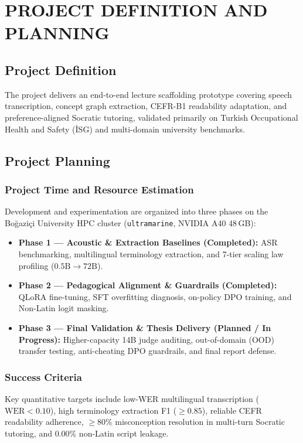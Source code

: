\documentclass[a4paper,12pt]{report}
\begin{document}
\chapter{PROJECT DEFINITION AND PLANNING}

\section{Project Definition}
The project delivers an end-to-end lecture scaffolding prototype covering speech transcription, concept graph extraction, CEFR-B1 readability adaptation, and preference-aligned Socratic tutoring, validated primarily on Turkish Occupational Health and Safety (\.{I}SG) and multi-domain university benchmarks.

\section{Project Planning}

\subsection{Project Time and Resource Estimation}
Development and experimentation are organized into three phases on the Bo\u{g}azi\c{c}i University HPC cluster (\texttt{ultramarine}, NVIDIA A40 48\,GB):
\begin{itemize}
    \item \textbf{Phase 1 --- Acoustic \& Extraction Baselines (Completed):} ASR benchmarking, multilingual terminology extraction, and 7-tier scaling law profiling ($0.5\text{B} \to 72\text{B}$).
    \item \textbf{Phase 2 --- Pedagogical Alignment \& Guardrails (Completed):} QLoRA fine-tuning, SFT overfitting diagnosis, on-policy DPO training, and Non-Latin logit masking.
    \item \textbf{Phase 3 --- Final Validation \& Thesis Delivery (Planned / In Progress):} Higher-capacity 14B judge auditing, out-of-domain (OOD) transfer testing, anti-cheating DPO guardrails, and final report defense.
\end{itemize}

\subsection{Success Criteria}
Key quantitative targets include low-WER multilingual transcription ($\text{WER} < 0.10$), high terminology extraction F1 ($\ge 0.85$), reliable CEFR readability adherence, $\ge 80\%$ misconception resolution in multi-turn Socratic tutoring, and $0.00\%$ non-Latin script leakage.
\end{document}
